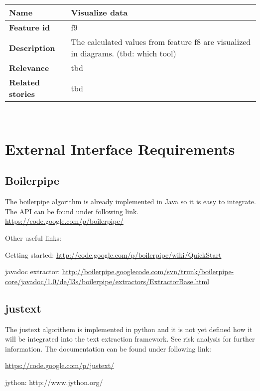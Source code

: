 
	\begin{tabular}{ | p{3cm} | p{12cm} |}
	\hline
	\textbf{Name} 				& Visualize data \\ \hline
	\textbf{Feature id} 		& f9 \\ \hline
	\textbf{Description} 		& The calculated values from feature f8 are visualized in diagrams. (tbd: which tool)\\ \hline
	\textbf{Relevance} 			& tbd\\ \hline
	\textbf{Related stories} 	& tbd \\ \hline
	\end{tabular} \\

\section{External Interface Requirements}

\subsection{Boilerpipe}

The boilerpipe algorithm is already implemented in Java so it is easy to integrate. The API can be found under following link. 
\url{https://code.google.com/p/boilerpipe/}

Other useful links:

Getting started:
\url{http://code.google.com/p/boilerpipe/wiki/QuickStart}

javadoc extractor:
\url{http://boilerpipe.googlecode.com/svn/trunk/boilerpipe-core/javadoc/1.0/de/l3s/boilerpipe/extractors/ExtractorBase.html}


\subsection{justext}

The justext algorithem is implemented in python and it is not yet defined how it will be integrated into the text extraction framework. See risk analysis for further information.
The documentation can be found under following link: 

\url{https://code.google.com/p/justext/}

jython:
http://www.jython.org/
